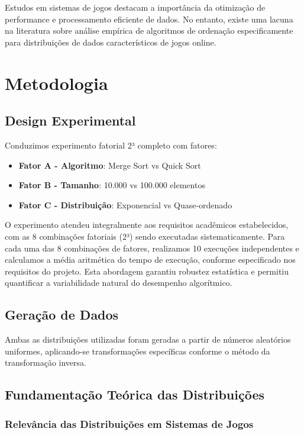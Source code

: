 \documentclass[conference]{IEEEtran}
\begin{document}
Estudos em sistemas de jogos destacam a importância da otimização de performance e processamento eficiente de dados. No entanto, existe uma lacuna na literatura sobre análise empírica de algoritmos de ordenação especificamente para distribuições de dados característicos de jogos online.

\section{Metodologia}

\subsection{Design Experimental}

Conduzimos experimento fatorial 2³ completo com fatores:

\begin{itemize}
\item \textbf{Fator A - Algoritmo}: Merge Sort vs Quick Sort
\item \textbf{Fator B - Tamanho}: 10.000 vs 100.000 elementos
\item \textbf{Fator C - Distribuição}: Exponencial vs Quase-ordenado
\end{itemize}

O experimento atendeu integralmente aos requisitos acadêmicos estabelecidos, com as 8 combinações fatoriais (2³) sendo executadas sistematicamente. Para cada uma das 8 combinações de fatores, realizamos 10 execuções independentes e calculamos a média aritmética do tempo de execução, conforme especificado nos requisitos do projeto. Esta abordagem garantiu robustez estatística e permitiu quantificar a variabilidade natural do desempenho algorítmico.

\subsection{Geração de Dados}

Ambas as distribuições utilizadas foram geradas a partir de números aleatórios uniformes, aplicando-se transformações específicas conforme o método da transformação inversa.

\subsection{Fundamentação Teórica das Distribuições}

\subsubsection{Relevância das Distribuições em Sistemas de Jogos}
\end{document}
